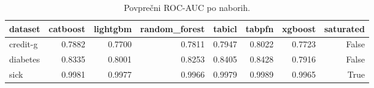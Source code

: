 \begin{table}[htbp]
\centering
\caption{Povprečni ROC-AUC po naborih.}
\label{tab:pivot}
\begin{tabular}{lrrrrrrr}
\hline
dataset & catboost & lightgbm & random\_forest & tabicl & tabpfn & xgboost & saturated \\
\hline
credit-g & 0.7882 & 0.7700 & 0.7811 & 0.7947 & 0.8022 & 0.7723 & False \\
diabetes & 0.8335 & 0.8001 & 0.8253 & 0.8405 & 0.8428 & 0.7916 & False \\
sick & 0.9981 & 0.9977 & 0.9966 & 0.9979 & 0.9989 & 0.9965 & True \\
\hline
\end{tabular}
\end{table}

